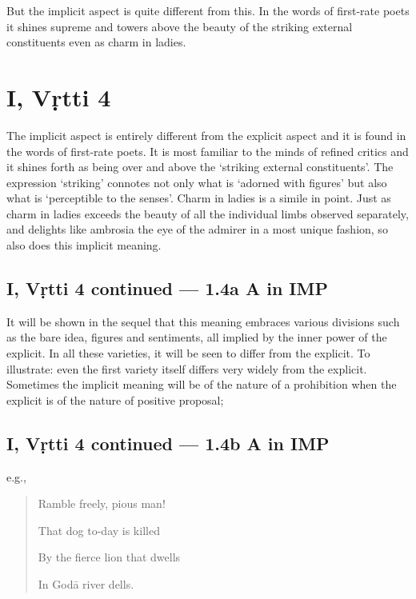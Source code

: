 \documentclass[12pt]{book}
\begin{document}
But the implicit aspect is quite different from this. In the
words of first-rate poets it shines supreme and towers above
the beauty of the striking external constituents even as charm
in ladies.


\section{I, Vṛtti 4}

The implicit aspect is entirely different from the explicit
aspect and it is found in the words of first-rate poets. It is
most familiar to the minds of refined critics and it shines forth as
being over and above the `striking external constituents'. The
expression `striking' connotes not only what is `adorned with
figures' but also what is `perceptible to the senses'. Charm in
ladies is a simile in point. Just as charm in ladies exceeds the
beauty of all the individual limbs observed separately, and
delights like ambrosia the eye of the admirer in a most unique
fashion, so also does this implicit meaning. 


\subsection{I, Vṛtti 4 continued --- 1.4a A in IMP}

It will be shown in
the sequel that this meaning embraces various divisions such as
the bare idea, figures and sentiments, all implied by the inner
power of the explicit. In all these varieties, it will be seen to
differ from the explicit. To illustrate: even the first variety itself
differs very widely from the explicit. Sometimes the implicit
meaning will be of the nature of a prohibition when the explicit
is of the nature of positive proposal; 


\subsection{I, Vṛtti 4 continued --- 1.4b A in IMP}
e.g.,

\begin{quotation}
\begin{em}
Ramble freely, pious man!

That dog to-day is killed

By the fierce lion that dwells

In Godā river dells.
\end{em}
\end{quotation}
\end{document}
